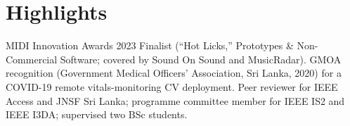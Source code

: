 \documentclass[11pt]{article}
\begin{document}
\section*{Highlights}
MIDI Innovation Awards 2023 Finalist (``Hot Licks,'' Prototypes \& Non-Commercial Software; covered by Sound On Sound and MusicRadar). GMOA recognition (Government Medical Officers' Association, Sri Lanka, 2020) for a COVID-19 remote vitals-monitoring CV deployment. Peer reviewer for IEEE Access and JNSF Sri Lanka; programme committee member for IEEE IS2 and IEEE I3DA; supervised two BSc students.
\end{document}
